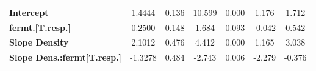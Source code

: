 \begin{table}[htp]
{\begin{tabular}{lSS[table-format=1.3]S[round-mode = places,
round-precision =3,table-format=-2.3]SSS}
	\textbf{Intercept}              &       1.4444  &        0.136     &    10.599  &         0.000        &         1.176 &    1.712       \\
	\textbf{fermt.[T.resp.]}        &       0.2500  &        0.148     &     1.684  &         0.093        &        -0.042  &   0.542       \\
	\textbf{Slope Density}                 &       2.1012  &        0.476     &     4.412  &         0.000        &         1.165  &   3.038       \\
	\textbf{Slope Dens.:fermt[T.resp.]} &      -1.3278  &        0.484     &    -2.743  &         0.006        &        -2.279   & -0.376       \\
	\bottomrule
	\end{tabular}
   }
\end{table}


